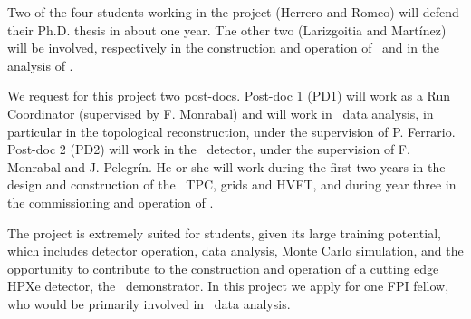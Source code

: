 Two of the four students working in the project (Herrero and Romeo) will defend their Ph.D. thesis in about one year. The other two (Larizgoitia and Mart\'inez) will be involved, respectively in the construction and operation of \HDEMO\ and in the analysis of \Next. 

We request for this project two post-docs. Post-doc 1 (PD1) will work as a Run Coordinator (supervised by F. Monrabal) and will work in \Next\ data analysis, in particular in the topological reconstruction, under the supervision of P. Ferrario. Post-doc 2 (PD2) will work in the \HDEMO\ detector, under the supervision of F. Monrabal and J. Pelegr\'in. He or she will work during the first two years in the design and construction of the
\HDEMO\ TPC, grids and HVFT, and during year three in the commissioning and operation of \NHD. 

The project is extremely suited for students, given its large training potential, which includes detector operation, data analysis, Monte Carlo simulation, and the opportunity to contribute to the construction and operation of a cutting edge HPXe detector, the \HDEMO\ demonstrator. In this project we apply for one FPI fellow, who would be primarily involved in \Next\ data analysis. 
